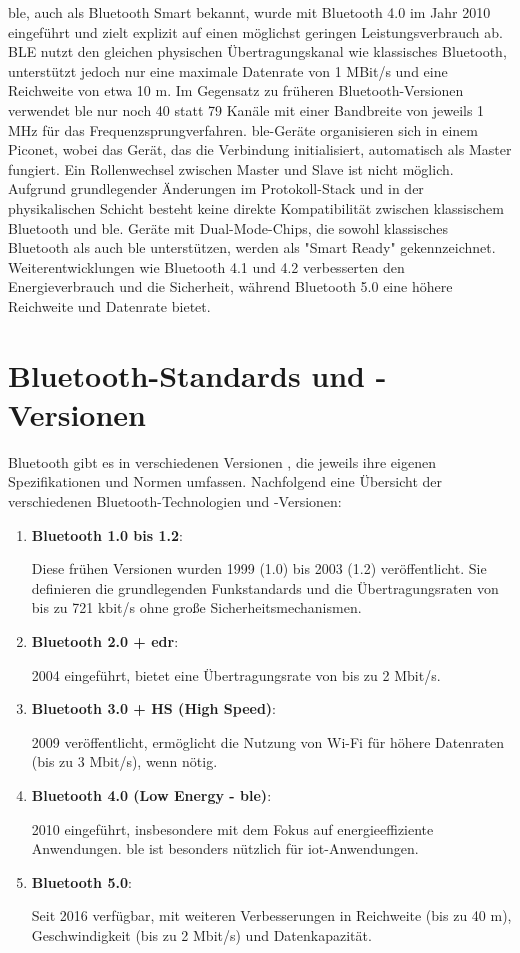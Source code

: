 \ac{ble}, auch als Bluetooth Smart bekannt, wurde mit Bluetooth 4.0 im Jahr 2010 eingeführt und zielt explizit auf einen möglichst geringen Leistungsverbrauch ab. BLE nutzt den gleichen physischen Übertragungskanal wie klassisches Bluetooth, unterstützt jedoch nur eine maximale Datenrate von 1 MBit/s und eine Reichweite von etwa 10 m. Im Gegensatz zu früheren Bluetooth-Versionen verwendet \ac{ble} nur noch 40 statt 79 Kanäle mit einer Bandbreite von jeweils 1 MHz für das Frequenzsprungverfahren. \ac{ble}-Geräte organisieren sich in einem Piconet, wobei das Gerät, das die Verbindung initialisiert, automatisch als Master fungiert. Ein Rollenwechsel zwischen Master und Slave ist nicht möglich. Aufgrund grundlegender Änderungen im Protokoll-Stack und in der physikalischen Schicht besteht keine direkte Kompatibilität zwischen klassischem Bluetooth und \ac{ble}. Geräte mit Dual-Mode-Chips, die sowohl klassisches Bluetooth als auch \ac{ble} unterstützen, werden als "Smart Ready" gekennzeichnet. Weiterentwicklungen wie Bluetooth 4.1 und 4.2 verbesserten den Energieverbrauch und die Sicherheit, während Bluetooth 5.0 eine höhere Reichweite und Datenrate bietet. \cite{Dembowski:2013}

\section{Bluetooth-Standards und -Versionen}

Bluetooth gibt es in verschiedenen Versionen \cite{Brandao:2018}, die jeweils ihre eigenen Spezifikationen und Normen umfassen. Nachfolgend eine Übersicht der verschiedenen Bluetooth-Technologien und -Versionen:

\begin{enumerate}
	\item \textbf{Bluetooth 1.0 bis 1.2}:

	Diese frühen Versionen wurden 1999 (1.0) bis 2003 (1.2) veröffentlicht. Sie definieren die grundlegenden Funkstandards und die Übertragungsraten von bis zu 721 kbit/s ohne große Sicherheitsmechanismen.

	\item \textbf{Bluetooth 2.0 + \ac{edr}}:

	2004 eingeführt, bietet eine Übertragungsrate von bis zu 2 Mbit/s.

	\item \textbf{Bluetooth 3.0 + HS (High Speed)}:

	2009 veröffentlicht, ermöglicht die Nutzung von Wi-Fi für höhere Datenraten (bis zu 3 Mbit/s), wenn nötig.

	\item \textbf{Bluetooth 4.0 (Low Energy - \ac{ble})}:

	2010 eingeführt, insbesondere mit dem Fokus auf energieeffiziente Anwendungen. \ac{ble} ist besonders nützlich für \ac{iot}-Anwendungen.

	\item \textbf{Bluetooth 5.0}:

	Seit 2016 verfügbar, mit weiteren Verbesserungen in Reichweite (bis zu 40 m), Geschwindigkeit (bis zu 2 Mbit/s) und Datenkapazität.

\end{enumerate}

